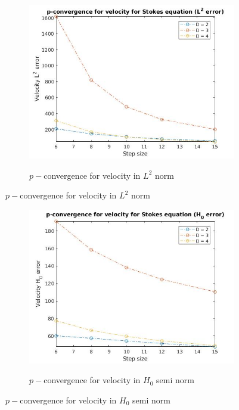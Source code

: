\documentclass{beamer}
\begin{document}
\begin{frame}
\begin{figure}
\begin{subfigure}{0.9\textwidth}
\centering
  \includegraphics[width=0.9\linewidth]{p_conv_velocity_l2_stokes.jpg}
  \label{p_convergence_velocity_l2}
  \caption{$p-$convergence for velocity in $L^2$ norm}
\end{subfigure}
\end{figure}
\end{frame}
\begin{frame}
\begin{figure}
\begin{subfigure}{0.9\textwidth}
\centering
  \includegraphics[width=0.9\linewidth]{p_conv_velocity_h0_stokes.jpg}
  \label{p_convergence_velocity_h0}
\caption{$p-$convergence for velocity in $H_0$ semi norm}
\end{subfigure}
\end{figure}
\end{frame}
\end{document}

